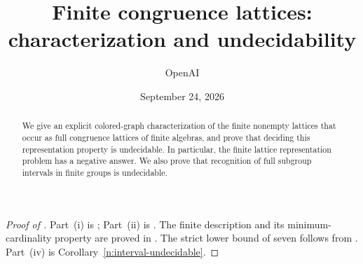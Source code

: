 \documentclass[11pt]{article}
\title{Finite congruence lattices:\\characterization and undecidability}
\author{OpenAI}
\date{September 24, 2026}
\theoremstyle{definition}
\theoremstyle{remark}
\numberwithin{equation}{section}
\begin{document}
\maketitle
\begin{abstract}
We give an explicit colored-graph characterization of the finite nonempty lattices
that occur as full congruence lattices of finite algebras, and prove that
deciding this representation property is undecidable. In particular, the
finite lattice representation problem has a negative answer. We also prove
that recognition of full subgroup intervals in finite groups is undecidable.
\end{abstract}
\tableofcontents


















\begin{proof}[Proof of ]
Part~\textup{(i)} is ; Part~\textup{(ii)} is
.  The finite description and its minimum-cardinality
property are proved in .  The strict lower bound of seven
follows from .  Part~\textup{(iv)} is
Corollary~\ref{n:interval-undecidable}.
\end{proof}
\begingroup
\raggedright
\renewcommand{\bibsection}{\section*{\refname}\addcontentsline{toc}{section}{\refname}}


\endgroup
\end{document}
